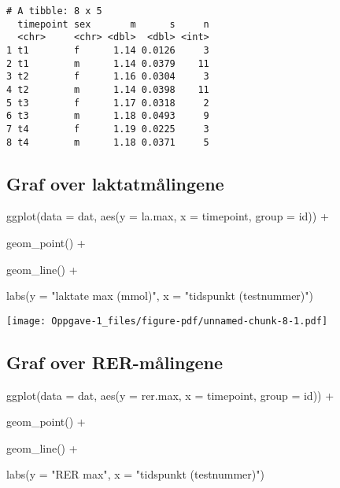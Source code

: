 \documentclass[
  letterpaper,
  DIV=11,
  numbers=noendperiod]{scrreprt}
\newenvironment{Shaded}{\begin{snugshade}}{\end{snugshade}}
\newcommand{\AttributeTok}[1]{\textcolor[rgb]{0.40,0.45,0.13}{#1}}
\newcommand{\FunctionTok}[1]{\textcolor[rgb]{0.28,0.35,0.67}{#1}}
\newcommand{\NormalTok}[1]{\textcolor[rgb]{0.00,0.23,0.31}{#1}}
\newcommand{\SpecialCharTok}[1]{\textcolor[rgb]{0.37,0.37,0.37}{#1}}
\newcommand{\StringTok}[1]{\textcolor[rgb]{0.13,0.47,0.30}{#1}}
\begin{document}
\begin{verbatim}
# A tibble: 8 x 5
  timepoint sex       m      s     n
  <chr>     <chr> <dbl>  <dbl> <int>
1 t1        f      1.14 0.0126     3
2 t1        m      1.14 0.0379    11
3 t2        f      1.16 0.0304     3
4 t2        m      1.14 0.0398    11
5 t3        f      1.17 0.0318     2
6 t3        m      1.18 0.0493     9
7 t4        f      1.19 0.0225     3
8 t4        m      1.18 0.0371     5
\end{verbatim}

\subsection{Graf over
laktatmålingene}\label{graf-over-laktatmuxe5lingene}

\begin{Shaded}
\begin{Highlighting}[]
\FunctionTok{ggplot}\NormalTok{(}\AttributeTok{data =}\NormalTok{ dat,}
       \FunctionTok{aes}\NormalTok{(}\AttributeTok{y =}\NormalTok{ la.max,}
           \AttributeTok{x =}\NormalTok{ timepoint,}
           \AttributeTok{group =}\NormalTok{ id)) }\SpecialCharTok{+}
  
  \FunctionTok{geom\_point}\NormalTok{() }\SpecialCharTok{+}
  
  \FunctionTok{geom\_line}\NormalTok{() }\SpecialCharTok{+} 
  
  \FunctionTok{labs}\NormalTok{(}\AttributeTok{y =} \StringTok{"laktate max (mmol)"}\NormalTok{,}
       \AttributeTok{x =} \StringTok{"tidspunkt (testnummer)"}\NormalTok{)}
\end{Highlighting}
\end{Shaded}

\texttt{[image: Oppgave-1\_files/figure-pdf/unnamed-chunk-8-1.pdf]}

\subsection{Graf over RER-målingene}\label{graf-over-rer-muxe5lingene}

\begin{Shaded}
\begin{Highlighting}[]
\FunctionTok{ggplot}\NormalTok{(}\AttributeTok{data =}\NormalTok{ dat,}
       \FunctionTok{aes}\NormalTok{(}\AttributeTok{y =}\NormalTok{ rer.max,}
           \AttributeTok{x =}\NormalTok{ timepoint,}
           \AttributeTok{group =}\NormalTok{ id)) }\SpecialCharTok{+}
  
  \FunctionTok{geom\_point}\NormalTok{() }\SpecialCharTok{+}
  
  \FunctionTok{geom\_line}\NormalTok{() }\SpecialCharTok{+} 
  
  \FunctionTok{labs}\NormalTok{(}\AttributeTok{y =} \StringTok{"RER max"}\NormalTok{,}
       \AttributeTok{x =} \StringTok{"tidspunkt (testnummer)"}\NormalTok{)}
\end{Highlighting}
\end{Shaded}
\end{document}
